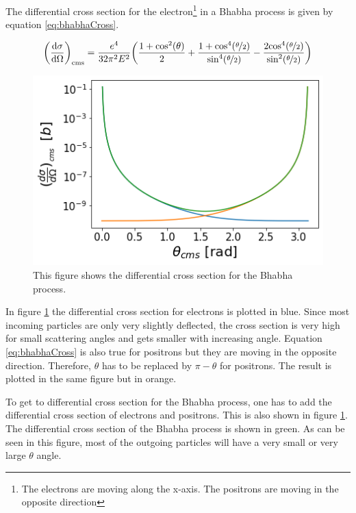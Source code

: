 \documentclass[a4paper,11pt,twosided,final,german,openbib,pdftex,listof=totoc,bibliography=totoc]{scrbook}
\begin{document}
The differential cross section for the electron\footnote{The electrons are moving along the x-axis. The positrons are moving in the opposite direction} in a Bhabha process is given by equation \ref{eq:bhabhaCross}. 

\begin{equation}
	\bigg(\frac{\textrm{d}\sigma}{\textrm{d}\Omega} \bigg)_{\textrm{cms}} = \frac{e^4}{32\pi^2 E^2}
	\bigg(
	\frac{1+\textrm{cos}^2(\theta)}{2} +
 \frac{1+\textrm{cos}^4(\nicefrac{\theta}{2})}{\textrm{sin}^4(\nicefrac{\theta}{2})} - \frac{2\textrm{cos}^4(\nicefrac{\theta}{2})}{\textrm{sin}^2(\nicefrac{\theta}{2})}   \bigg)
 \label{eq:bhabhaCross}
\end{equation}


\begin{figure}[h!]
	\centering
	\includegraphics[width=12cm]{Bilder/finalCross}
	\caption[Differential Cross Section For The Bhabha Process]{This figure shows the differential cross section for the Bhabha process.}
	\label{fig:CrossSectionBoth}
\end{figure}



In figure \ref{fig:CrossSectionBoth} the differential cross section for electrons is plotted in blue. Since most incoming particles are only very slightly deflected, the cross section is very high for small scattering angles and gets smaller with increasing angle. Equation \ref{eq:bhabhaCross} is also true for positrons but they are moving in the opposite direction. Therefore, $\theta$ has to be replaced by $\pi - \theta$ for positrons. The result is plotted in the same figure but in orange.


To get to differential cross section for the Bhabha process, one has to add the differential cross section of electrons and positrons. This is also shown in figure \ref{fig:CrossSectionBoth}. The differential cross section of the Bhabha process is shown in green. As can be seen in this figure, most of the outgoing particles will have a very small or very large $\theta$ angle.
\end{document}
